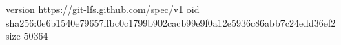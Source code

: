version https://git-lfs.github.com/spec/v1
oid sha256:0e6b1540e79657ffbc0c1799b902cacb99e9f0a12e5936c86abb7c24edd36ef2
size 50364
